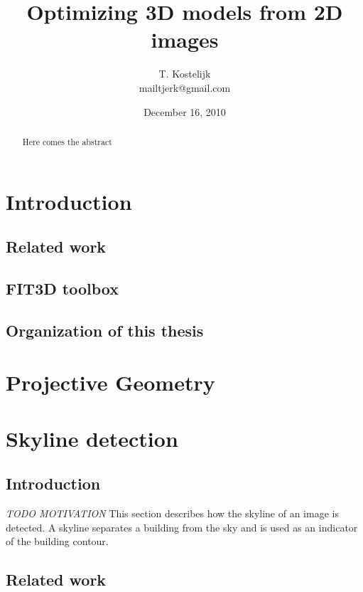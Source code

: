 \documentclass[10pt]{article}
\title{\sc Optimizing 3D models from 2D images}
\author{T. Kostelijk\\mailtjerk@gmail.com}
\date{December 16, 2010}
\begin{document}
\maketitle
\begin{abstract}
Here comes the abstract
\end{abstract}




\section{Introduction}
 \subsection{Related work}
 \subsection{FIT3D toolbox}
 \subsection{Organization of this thesis}

\section{Projective Geometry}

\section{Skyline detection}
 \subsection{Introduction}

\textit{ TODO MOTIVATION}
This section describes how the skyline of an image is detected. A skyline
separates a building from the sky and is used as an indicator of the building contour.
\\
 \subsection{Related work}
\end{document}
